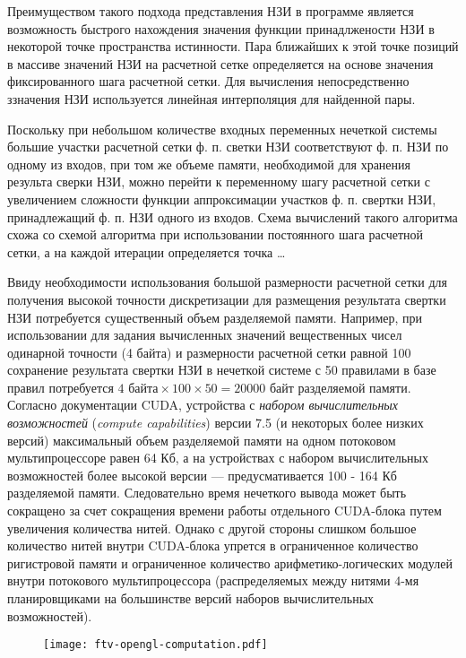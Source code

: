 Преимуществом такого подхода представления НЗИ в программе является возможность быстрого нахождения значения функции принадлжености НЗИ в некоторой точке пространства истинности. Пара ближайших к этой точке позиций в массиве значений НЗИ на расчетной сетке определяется на основе значения фиксированного шага расчетной сетки. Для вычисления непосредственно ззначения НЗИ используется линейная интерполяция для найденной пары.

Поскольку при небольшом количестве входных переменных нечеткой системы большие участки расчетной сетки ф. п. светки НЗИ соответствуют ф. п. НЗИ по одному из входов, при том же объеме памяти, необходимой для хранения результа сверки НЗИ, можно перейти к переменному шагу расчетной сетки с увеличением сложности функции аппроксимации участков ф. п. свертки НЗИ, принадлежащий ф. п. НЗИ одного из входов. Схема вычислений такого алгоритма схожа со схемой алгоритма при использовании постоянного шага расчетной сетки, а на каждой итерации определяется точка \dots

Ввиду необходимости использования большой размерности расчетной сетки для получения высокой точности дискретизации для размещения результата свертки НЗИ потребуется существенный объем разделяемой памяти. Например, при использовании для задания вычисленных значений вещественных чисел одинарной точности (4 байта) и размерности расчетной сетки равной 100 сохранение результата свертки НЗИ в нечеткой системе с 50 правилами в базе правил потребуется $4\textrm{ байта}\times 100 \times 50 = 20000\textrm{ байт}$ разделяемой памяти. Согласно документации CUDA, устройства с \textit{набором вычислительных возможностей} (\textit{compute capabilities}) версии 7.5 (и некоторых более низких версий) максимальный объем разделяемой памяти на одном потоковом мультипроцессоре равен 64 Кб, а на устройствах с набором вычислительных возможностей более высокой версии --- предусмативается 100 - 164 Кб разделяемой памяти. Следовательно время нечеткого вывода может быть сокращено за счет сокращения времени работы отдельного CUDA-блока путем увеличения количества нитей. Однако с другой стороны слишком большое количество нитей внутри CUDA-блока упрется в ограниченное количество ригистровой памяти и ограниченное количество арифметико-логических модулей внутри потокового мультипроцессора (распределяемых между нитями 4-мя планировщиками на большинстве версий наборов вычислительных возможностей).

\begin{figure}[hbt]
	\centering
   	\texttt{[image: ftv-opengl-computation.pdf]}
	\label{ftv-opengl-computation}
\end{figure}

